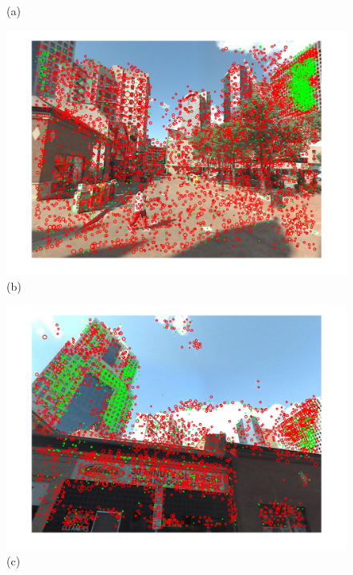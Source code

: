 \begin{figure}[]
\begin{minipage}{0.48\linewidth}
\begin{minipage}{\wii}
            \newline
            (a)
          \end{minipage}  
          \begin{minipage}{\wii}
            \centering
            \includegraphics[width=\linewidth]{imgs/wVS3q/2932/bftrs.jpg}
            \newline
            (b)
          \end{minipage}  
          \begin{minipage}{\wii}
            \centering
            \includegraphics[width=\linewidth]{imgs/wVS3q/2932/cftrs.jpg}
            \newline
            (c)
          \end{minipage} 
    \end{minipage}%

\end{figure}
